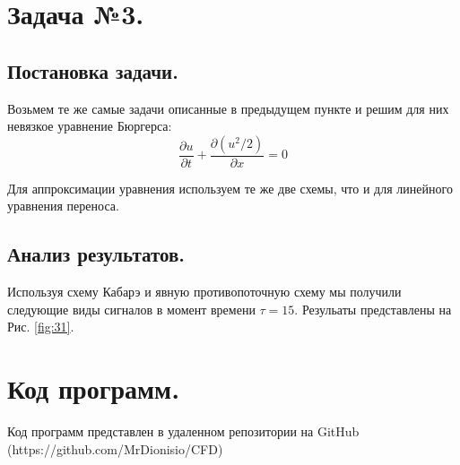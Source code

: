 \section{Задача №3.}
\subsection{Постановка задачи.}
Возьмем те же самые задачи описанные в предыдущем пункте и решим для них невязкое уравнение Бюргерса:
\begin{equation}
    \frac{\partial u}{\partial t}+\frac{\partial (u^2/2)}{\partial x}=0
\end{equation}

Для аппроксимации уравнения используем те же две схемы, что и для линейного уравнения переноса.
\subsection{Анализ результатов.}
Используя схему Кабарэ и явную противопоточную схему мы получили следующие виды сигналов в момент времени $\tau=15$. Резульаты представлены на Рис. \ref{fig:31}.


\section{Код программ.}
Код программ представлен в удаленном репозитории на GitHub \\ (https://github.com/MrDionisio/CFD)
